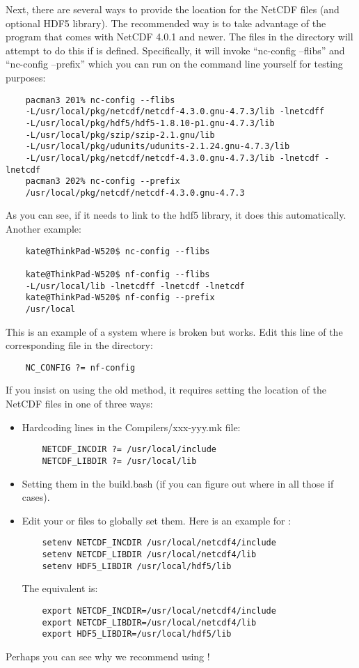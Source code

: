 Next, there are several ways to provide the location for the NetCDF
files (and optional HDF5 library). The recommended way is to take
advantage of the  program that comes with NetCDF 4.0.1
and newer. The files in the  directory will attempt
to do this if  is defined. Specifically, it will
invoke ``nc-config --flibs'' and ``nc-config --prefix'' which you can
run on the command line yourself for testing purposes:
\begin{verbatim}
    pacman3 201% nc-config --flibs
    -L/usr/local/pkg/netcdf/netcdf-4.3.0.gnu-4.7.3/lib -lnetcdff
    -L/usr/local/pkg/hdf5/hdf5-1.8.10-p1.gnu-4.7.3/lib
    -L/usr/local/pkg/szip/szip-2.1.gnu/lib
    -L/usr/local/pkg/udunits/udunits-2.1.24.gnu-4.7.3/lib
    -L/usr/local/pkg/netcdf/netcdf-4.3.0.gnu-4.7.3/lib -lnetcdf -lnetcdf
    pacman3 202% nc-config --prefix
    /usr/local/pkg/netcdf/netcdf-4.3.0.gnu-4.7.3
\end{verbatim}
As you can see, if it needs to link to the hdf5 library, it does
this automatically. Another example:
\begin{verbatim}
    kate@ThinkPad-W520$ nc-config --flibs

    kate@ThinkPad-W520$ nf-config --flibs
    -L/usr/local/lib -lnetcdff -lnetcdf -lnetcdf
    kate@ThinkPad-W520$ nf-config --prefix
    /usr/local
\end{verbatim}
This is an example of a system where  is broken but
 works. Edit this line of the corresponding file in the
 directory:
\begin{verbatim}
    NC_CONFIG ?= nf-config
\end{verbatim}
If you insist on using the old method, it requires setting the
location of the NetCDF files in one of three ways:
\begin{itemize}
  \item Hardcoding lines in the Compilers/xxx-yyy.mk file:
\begin{verbatim}
    NETCDF_INCDIR ?= /usr/local/include
    NETCDF_LIBDIR ?= /usr/local/lib
\end{verbatim}
  \item Setting them in the build.bash (if you can figure out where in
all those if cases).
  \item Edit your  or  files to globally
set them. Here is an example for
:
\begin{verbatim}
    setenv NETCDF_INCDIR /usr/local/netcdf4/include
    setenv NETCDF_LIBDIR /usr/local/netcdf4/lib
    setenv HDF5_LIBDIR /usr/local/hdf5/lib
\end{verbatim}
The  equivalent is:
\begin{verbatim}
    export NETCDF_INCDIR=/usr/local/netcdf4/include
    export NETCDF_LIBDIR=/usr/local/netcdf4/lib
    export HDF5_LIBDIR=/usr/local/hdf5/lib
\end{verbatim}
\end{itemize}
Perhaps you can see why we recommend using !

